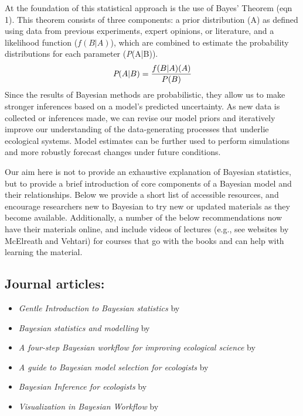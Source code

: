 \documentclass{article}
\begin{document}
At the foundation of this statistical approach is the use of Bayes' Theorem (eqn 1). This theorem consists of three components: a prior distribution (A) %
as defined using data from previous experiments, expert opinions, or literature, and a likelihood function ($f(B|A)$), which are combined to estimate the probability distributions for each parameter (\emph{P}(A|B)). \\
\begin{align}
 \emph{P}(A|B) = \frac{f(B|A)(A)}{P(B)}
 \end{align}
Since the results of Bayesian methods are probabilistic, they allow us to make stronger inferences based on a model's predicted uncertainty. As new data is collected or inferences made, we can revise our model priors and iteratively improve our understanding of the data-generating processes that underlie ecological systems. Model estimates can be further used to perform simulations and more robustly forecast changes under future conditions. 

Our aim here is not to provide an exhaustive explanation of Bayesian statistics, but to provide a brief introduction of core components of a Bayesian model and their relationships. Below we provide a short list of accessible resources, and encourage researchers new to Bayesian to try new or updated materials as they become available. Additionally, a number of the below recommendations now have their materials online, and include videos of lectures (e.g., see websites by McElreath and Vehtari) for courses that go with the books and can help with learning the material.

\subsection*{\textbf{Journal articles:}}
\begin{itemize}
\item \emph{Gentle Introduction to Bayesian statistics} by \cite{van2014gentle}
\item \emph{Bayesian statistics and modelling} by \cite{vandeSchoot2021}
\item \emph{A four-step Bayesian workflow for improving ecological science} by \cite{wolkovich2026}
\item \emph{A guide to Bayesian model selection for ecologists} by \cite{hooten2015guide}
\item \emph{Bayesian Inference for ecologists} by \cite{ellison2004}
\item \emph{Visualization in Bayesian Workflow} by \cite{gabry2019}
\end{itemize}
\end{document}
